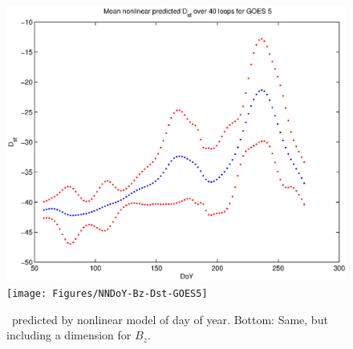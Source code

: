 \begin{figure}[htp!]
	\centering
	\includegraphics[width=0.7\linewidth]{Figures/NNDoY-Dst-GOES5}	
	\texttt{[image: Figures/NNDoY-Bz-Dst-GOES5]}
	\caption{\dst\ predicted by nonlinear model of day of year. Bottom: Same, but including a dimension for $B_z$. }
	\label{fig:DoYDst}
\end{figure}
